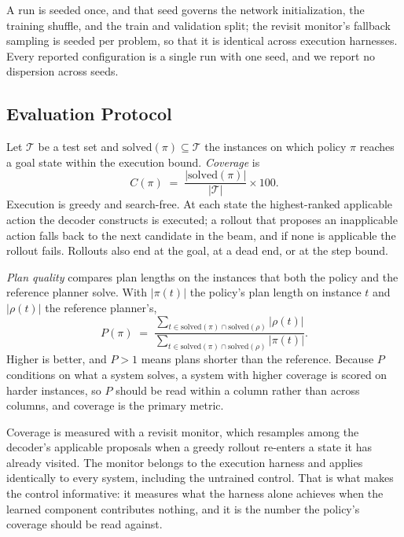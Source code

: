 \documentclass[letterpaper]{article}
\begin{document}
A run is seeded once, and that seed governs the network initialization, the
training shuffle, and the train and validation split; the revisit monitor's
fallback sampling is seeded per problem, so that it is identical across
execution harnesses. Every reported configuration is a single run with one
seed, and we report no dispersion across seeds.

\subsection{Evaluation Protocol}
\label{app:metrics}

Let $\mathcal{T}$ be a test set and $\mathrm{solved}(\pi) \subseteq
\mathcal{T}$ the instances on which policy $\pi$ reaches a goal state within
the execution bound. \emph{Coverage} is
\begin{equation*}
C(\pi) \;=\; \frac{|\mathrm{solved}(\pi)|}{|\mathcal{T}|} \times 100 .
\end{equation*}
Execution is greedy and search-free. At each state the highest-ranked
applicable action the decoder constructs is executed; a rollout that proposes
an inapplicable action falls back to the next candidate in the beam, and if
none is applicable the rollout fails. Rollouts also end at the goal, at a
dead end, or at the step bound.

\emph{Plan quality} compares plan lengths on the instances that both the
policy and the reference planner solve. With $|\pi(t)|$ the policy's plan
length on instance $t$ and $|\rho(t)|$ the reference planner's,
\begin{equation*}
P(\pi) \;=\; \frac{\sum_{t \in \mathrm{solved}(\pi) \cap \mathrm{solved}(\rho)} |\rho(t)|}
                 {\sum_{t \in \mathrm{solved}(\pi) \cap \mathrm{solved}(\rho)} |\pi(t)|} .
\end{equation*}
Higher is better, and $P > 1$ means plans shorter than the reference. Because
$P$ conditions on what a system solves, a system with higher coverage is
scored on harder instances, so $P$ should be read within a column rather than
across columns, and coverage is the primary metric.

Coverage is measured with a revisit monitor, which resamples among the
decoder's applicable proposals when a greedy rollout re-enters a state it has
already visited. The monitor belongs to the execution harness and applies
identically to every system, including the untrained control. That is what
makes the control informative: it measures what the harness alone achieves
when the learned component contributes nothing, and it is the number the
policy's coverage should be read against.
\end{document}

